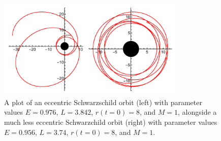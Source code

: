 \begin{figure}[!ht]
    \centering
    \includegraphics[width=0.8\textwidth]{images/schwarzSymmetry.pdf}
    \caption[Schwarzschild black hole examples]{A plot of an eccentric Schwarzschild orbit (left) with parameter values $E=0.976$, $L=3.842$, $r(t=0)=8$, and $M=1$, alongside a much less eccentric Schwarzchild orbit (right) with parameter values $E=0.956$, $L=3.74$, $r(t=0)=8$, and $M=1$.}
    \label{fig:symOrbits}
\end{figure}


